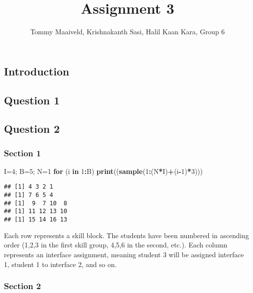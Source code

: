 \documentclass[]{article}
\title{Assignment 3}
\author{Tommy Maaiveld, Krishnakanth Sasi, Halil Kaan Kara, Group 6}
\date{}
\newenvironment{Shaded}{\begin{snugshade}}{\end{snugshade}}
\newcommand{\KeywordTok}[1]{\textcolor[rgb]{0.13,0.29,0.53}{\textbf{#1}}}
\newcommand{\DecValTok}[1]{\textcolor[rgb]{0.00,0.00,0.81}{#1}}
\newcommand{\ControlFlowTok}[1]{\textcolor[rgb]{0.13,0.29,0.53}{\textbf{#1}}}
\newcommand{\OperatorTok}[1]{\textcolor[rgb]{0.81,0.36,0.00}{\textbf{#1}}}
\newcommand{\NormalTok}[1]{#1}
\begin{document}
\maketitle

\subsection{Introduction}\label{introduction}

\subsection{Question 1}\label{question-1}

\subsection{Question 2}\label{question-2}

\subsubsection{Section 1}\label{section-1}

\begin{Shaded}
\begin{Highlighting}[]
\NormalTok{I=}\DecValTok{4}\NormalTok{; B=}\DecValTok{5}\NormalTok{; N=}\DecValTok{1}
\ControlFlowTok{for}\NormalTok{ (i }\ControlFlowTok{in} \DecValTok{1}\OperatorTok{:}\NormalTok{B) }\KeywordTok{print}\NormalTok{((}\KeywordTok{sample}\NormalTok{(}\DecValTok{1}\OperatorTok{:}\NormalTok{(N}\OperatorTok{*}\NormalTok{I)}\OperatorTok{+}\NormalTok{(i}\OperatorTok{-}\DecValTok{1}\NormalTok{)}\OperatorTok{*}\DecValTok{3}\NormalTok{)))}
\end{Highlighting}
\end{Shaded}

\begin{verbatim}
## [1] 4 3 2 1
## [1] 7 6 5 4
## [1]  9  7 10  8
## [1] 11 12 13 10
## [1] 15 14 16 13
\end{verbatim}

Each row represents a skill block. The students have been numbered in
ascending order (1,2,3 in the first skill group, 4,5,6 in the second,
etc.). Each column represents an interface assignment, meaning student 3
will be assigned interface 1, student 1 to interface 2, and so on.

\subsubsection{Section 2}\label{section-2}
\end{document}
